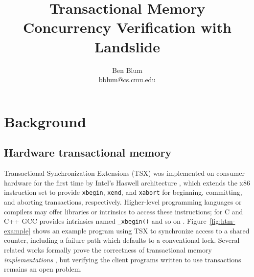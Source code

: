 \documentclass{article}
\begin{document}
%

\title{
Transactional Memory Concurrency Verification with Landslide
}

\author{Ben Blum \\ bblum@cs.cmu.edu}
\date{}

\maketitle

%


\section{Background}
\label{sec:background}

\subsection{Hardware transactional memory}

Transactional Synchronization Extensions (TSX) was implemented on consumer hardware for the first time by Intel's Haswell architecture \cite{htm-haswell},
which extends the x86 instruction set to provide
{\tt xbegin}, {\tt xend}, and {\tt xabort} for beginning, committing, and aborting
transactions, respectively.
Higher-level programming languages or compilers may offer libraries or intrinsics to access these instructions;
for C and C++ GCC provides intrinsics named {\tt \_xbegin()} and so on \cite{htm-gcc}.
Figure~\ref{fig:htm-example} shows an example program using TSX to synchronize access to a shared counter,
including a failure path which defaults to a conventional lock.
Several related works formally prove the correctness of transactional memory {\em implementations}
\cite{specifying-verifying-tm,tm-correctness,tm-completeness,mc-tm-with-spin},
but verifying the client programs written to use transactions remains an open problem.
\end{document}
